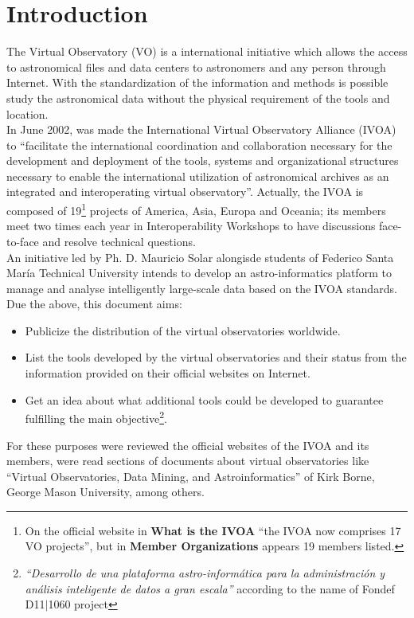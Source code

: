 \section{Introduction}
	The Virtual Observatory (VO) is a international initiative which allows
the access to astronomical files and data centers to astronomers and any person
through Internet. With the standardization of the information and methods is
possible study the astronomical data without the physical requirement of the
tools and location.\\

	In June 2002, was made the International Virtual Observatory Alliance
(IVOA) to ``facilitate the international coordination and collaboration
necessary for the development and deployment of the tools, systems and
organizational structures necessary to enable the international utilization of
astronomical archives as an integrated and interoperating virtual observatory''.
Actually, the IVOA is composed of 19\footnote{On the official website in
\textbf{What is the IVOA} ``the IVOA now comprises 17 VO projects'', but in
\textbf{Member Organizations} appears 19 members listed.} projects of America,
Asia, Europa and Oceania; its members meet two times each year in
Interoperability  Workshops to have discussions face-to-face and resolve
technical questions.\\

	An initiative led by Ph. D. Mauricio Solar alongisde students of
Federico Santa Mar\'{i}a Technical University intends to develop an
astro-informatics platform to manage and analyse intelligently large-scale data
based on the IVOA standards. Due the above, this document aims:

\begin{itemize}
	\item Publicize the distribution of the virtual observatories worldwide.
	\item List the tools developed by the virtual observatories and their
status from the information provided on their official websites on Internet.
	\item Get an idea about what additional tools could be developed to
guarantee fulfilling the main objective\footnote{\textit{``Desarrollo de una
plataforma astro-inform\'{a}tica para la administraci\'{o}n y an\'{a}lisis
inteligente de datos a gran escala''} according to the name of Fondef D11$
\vert $1060 project}.
\end{itemize}

For these purposes were reviewed the official websites of the IVOA and its
members, were read sections of documents about virtual observatories like
``Virtual Observatories, Data Mining, and Astroinformatics'' of Kirk Borne,
George Mason University, among others.\\
